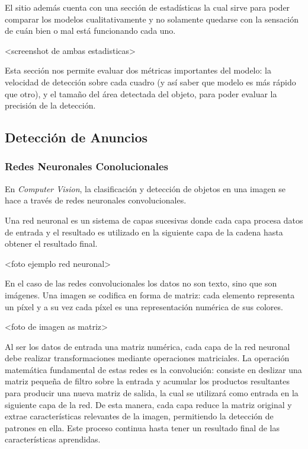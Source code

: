 \documentclass[a4paper]{article}
\begin{document}
El sitio además cuenta con una sección de estadísticas la cual sirve para poder comparar los modelos cualitativamente y no solamente quedarse con la sensación de cuán bien o mal está funcionando cada uno.

<screenshot de ambas estadisticas>

Esta sección nos permite evaluar dos métricas importantes del modelo: la velocidad de detección sobre cada cuadro (y así saber que modelo es más rápido que otro), y el tamaño del área detectada del objeto, para poder evaluar la precisión de la detección.

\subsection{Detección de Anuncios}

\subsubsection{Redes Neuronales Conolucionales}

En \textit{Computer Vision}, la clasificación y detección de objetos en una imagen se hace a través de redes neuronales convolucionales.

Una red neuronal es un sistema de capas sucesivas donde cada capa procesa datos de entrada y el resultado es utilizado en la siguiente capa de la cadena hasta obtener el resultado final.

<foto ejemplo red neuronal>

En el caso de las redes convolucionales los datos no son texto, sino que son imágenes.
Una imagen se codifica en forma de matriz: cada elemento representa un píxel y a su vez cada píxel es una representación numérica de sus colores.

<foto de imagen as matriz>

Al ser los datos de entrada una matriz numérica, cada capa de la red neuronal debe realizar transformaciones mediante operaciones matriciales. La operación matemática fundamental de estas redes es la convolución: consiste en deslizar una matriz pequeña de filtro sobre la entrada y acumular los productos resultantes para producir una nueva matriz de salida, la cual se utilizará como entrada en la siguiente capa de la red. De esta manera, cada capa reduce la matriz original y extrae características relevantes de la imagen, permitiendo la detección de patrones en ella. Este proceso continua hasta tener un resultado final de las características aprendidas.
\end{document}
